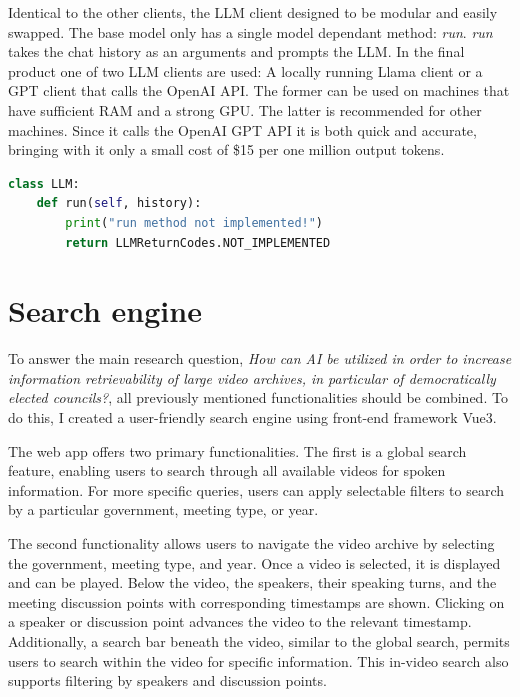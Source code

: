 \documentclass[twoside]{uva-inf-bachelor-thesis}
\begin{document}
Identical to the other clients, the LLM client designed to be modular and easily swapped. The base model only has a single model dependant method: \textit{run}. \textit{run} takes the chat history as an arguments and prompts the LLM. 
In the final product one of two LLM clients are used: A locally running Llama client or a GPT client that calls the OpenAI API. The former can be used on machines that have sufficient RAM and a strong GPU. The latter is recommended for other machines. Since it calls the OpenAI GPT API it is both quick and accurate, bringing with it only a small cost of \$15 per one million output tokens.

\begin{lstlisting}[language=Python, caption={Modular LLM class.}]
class LLM:
    def run(self, history):
        print("run method not implemented!")
        return LLMReturnCodes.NOT_IMPLEMENTED
\end{lstlisting}

\section{Search engine}
To answer the main research question, \textit{How can AI be utilized in order to increase information retrievability of large video archives, in particular of democratically elected councils?}, all previously mentioned functionalities should be combined. To do this, I created a user-friendly search engine using front-end framework Vue3.

The web app offers two primary functionalities. The first is a global search feature, 
enabling users to search through all available videos for spoken information. For more specific queries, users can apply selectable filters to search by a particular government, meeting type, or year.

The second functionality allows users to navigate the video archive by selecting the government, meeting type, and year. Once a video is selected, it is displayed and can be played. 
Below the video, the speakers, their speaking turns, and the meeting discussion points with corresponding timestamps are shown. Clicking on a speaker or discussion point advances the video to the relevant timestamp. Additionally, a search bar beneath the video, similar to the global search, permits users to search within the video for specific information. This in-video search also supports filtering by speakers and discussion points.
\end{document}

